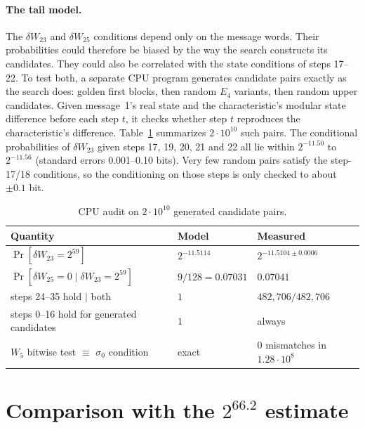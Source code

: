 \documentclass[11pt]{article}
\begin{document}
\paragraph{The tail model.} The $\delta W_{23}$ and $\delta W_{25}$ conditions depend only on the message words. Their probabilities could therefore be biased by the way the search constructs its candidates. They could also be correlated with the state conditions of steps 17--22. To test both, a separate CPU program generates candidate pairs exactly as the search does: golden first blocks, then random $E_4$ variants, then random upper candidates. Given message~1's real state and the characteristic's modular state difference before each step $t$, it checks whether step $t$ reproduces the characteristic's difference. Table~\ref{tab:audit} summarizes $2\cdot 10^{10}$ such pairs. The conditional probabilities of $\delta W_{23}$ given steps 17, 19, 20, 21 and 22 all lie within $2^{-11.50}$ to $2^{-11.56}$ (standard errors 0.001--0.10 bits). Very few random pairs satisfy the step-17/18 conditions, so the conditioning on those steps is only checked to about $\pm 0.1$ bit.

\begin{table}[h]
\centering
\caption{CPU audit on $2\cdot10^{10}$ generated candidate pairs.}
\label{tab:audit}
\begin{tabular}{lll}
\toprule
Quantity & Model & Measured \\
\midrule
$\Pr[\delta W_{23}=2^{59}]$ & $2^{-11.5114}$ & $2^{-11.5104\pm0.0006}$ \\
$\Pr[\delta W_{25}=0\mid \delta W_{23}=2^{59}]$ & $9/128=0.07031$ & $0.07041$ \\
steps 24--35 hold $\mid$ both & $1$ & $482{,}706/482{,}706$ \\
steps 0--16 hold for generated candidates & $1$ & always \\
$W_5$ bitwise test $\equiv$ $\sigma_0$ condition & exact & 0 mismatches in $1.28\cdot10^8$ \\
\bottomrule
\end{tabular}
\end{table}

\section{Comparison with the \texorpdfstring{$2^{66.2}$}{2\textasciicircum 66.2} estimate}\label{sec:compare}
\end{document}
